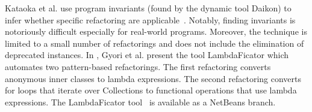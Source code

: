 \documentclass[10pt,conference]{IEEEtran}
\begin{document}
%
%
%
Kataoka et al. use
program invariants (found by the dynamic tool Daikon) to infer
whether specific refactoring are applicable~\cite{Kataoka:2001:ASP:846228.848644}. %
Notably, %
finding invariants is notoriously difficult especially
for real-world programs. Moreover, the technique is limited to a small number of refactorings and does not include
the elimination of deprecated instances.
In \cite{conf/sigsoft/GyoriFDL13}, Gyori et al. present the tool {\sc LambdaFicator} which
automates two pattern-based refactorings. The first refactoring converts
anonymous inner classes to lambda expressions. The second
refactoring converts for loops that iterate over Collections
to functional operations that use lambda expressions.
The {\sc LambdaFicator} tool~\cite{DBLP:conf/icse/FranklinGLD04} is available as a
NetBeans branch.



\end{document}
